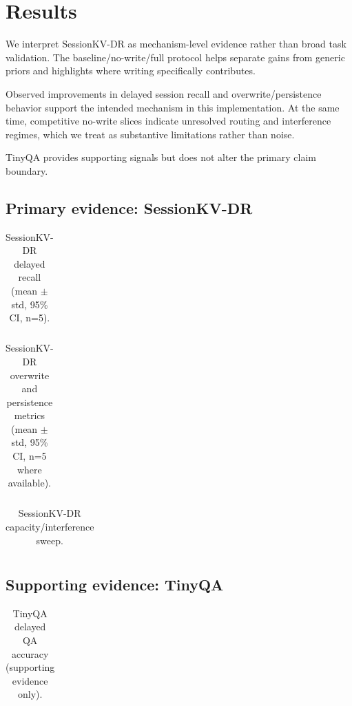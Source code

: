 \section{Results}
We interpret SessionKV-DR as mechanism-level evidence rather than broad task validation. The baseline/no-write/full protocol helps separate gains from generic priors and highlights where writing specifically contributes.

Observed improvements in delayed session recall and overwrite/persistence behavior support the intended mechanism in this implementation. At the same time, competitive no-write slices indicate unresolved routing and interference regimes, which we treat as substantive limitations rather than noise.

TinyQA provides supporting signals but does not alter the primary claim boundary.

\subsection{Primary evidence: SessionKV-DR}
\begin{table}[h]
\centering
\begin{tabular}{llll}
\toprule

\bottomrule
\end{tabular}
\caption{SessionKV-DR delayed recall (mean $\pm$ std, 95\% CI, n=5).}
\end{table}

\begin{table}[h]
\centering
\begin{tabular}{llll}
\toprule

\bottomrule
\end{tabular}
\caption{SessionKV-DR overwrite and persistence metrics (mean $\pm$ std, 95\% CI, n=5 where available).}
\end{table}

\begin{table}[h]
\centering
\begin{tabular}{llll}
\toprule

\bottomrule
\end{tabular}
\caption{SessionKV-DR capacity/interference sweep.}
\end{table}

\subsection{Supporting evidence: TinyQA}
\begin{table}[h]
\centering
\begin{tabular}{llll}
\toprule

\bottomrule
\end{tabular}
\caption{TinyQA delayed QA accuracy (supporting evidence only).}
\end{table}

